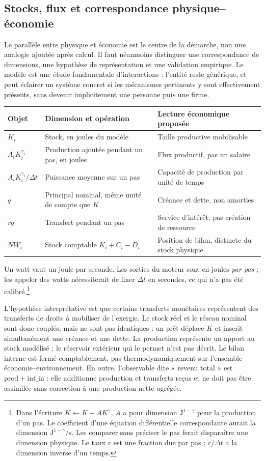 \subsection{Stocks, flux et correspondance physique--économie}
\label{sec:physique}
Le parallèle entre physique et économie est le centre de la démarche, non une
analogie ajoutée après calcul. Il faut néanmoins distinguer une correspondance
de dimensions, une hypothèse de représentation et une validation empirique.
Le modèle est une étude fondamentale d'interactions : l'entité reste générique,
et peut éclairer un système concret si les mécanismes pertinents y sont
effectivement présents, sans devenir implicitement une personne puis une firme.

\begin{center}
\begin{tabularx}{\linewidth}{@{}lXX@{}}
\toprule
Objet & Dimension et opération & Lecture économique proposée \\
\midrule
$K_i$ & Stock, en joules du modèle & Taille productive mobilisable \\
$A_iK_i^{\gamma_i}$ & Production ajoutée pendant un pas, en joules & Flux productif, pas un salaire \\
$A_iK_i^{\gamma_i}/\Delta t$ & Puissance moyenne sur un pas & Capacité de production par unité de temps \\
$q$ & Principal nominal, même unité de compte que $K$ & Créance et dette, non amorties \\
$rq$ & Transfert pendant un pas & Service d'intérêt, pas création de ressource \\
$NW_i$ & Stock comptable $K_i+C_i-D_i$ & Position de bilan, distincte du stock physique \\
\bottomrule
\end{tabularx}
\end{center}
Un watt vaut un joule par seconde. Les sorties du moteur sont en joules
\emph{par pas} ; les appeler des watts nécessiterait de fixer $\Delta t$ en
secondes, ce qui n'a pas été calibré.\footnote{Dans l'écriture
$K\leftarrow K+A K^\gamma$, $A$ a pour dimension
$\mathrm{J}^{1-\gamma}$ pour la production d'un pas. Le coefficient d'une
équation différentielle correspondante aurait la dimension
$\mathrm{J}^{1-\gamma}/\mathrm{s}$. Les comparer sans préciser le pas ferait
disparaître une dimension physique. Le taux $r$ est une fraction due par pas ;
$r/\Delta t$ a la dimension inverse d'un temps.}

L'hypothèse interprétative est que certains transferts monétaires représentent
des transferts de droits à mobiliser de l'exergie. Le stock réel et le réseau
nominal sont donc couplés, mais ne sont pas identiques : un prêt déplace $K$ et
inscrit simultanément une créance et une dette. La production représente un
apport au stock modélisé ; le réservoir extérieur qui le permet n'est pas
décrit. Le bilan interne est fermé comptablement, pas thermodynamiquement sur
l'ensemble économie--environnement. En outre, l'observable dite « revenu total »
est $\mathrm{prod}+\mathrm{int\_in}$ : elle additionne production et transferts
reçus et ne doit pas être assimilée sans correction à une production nette
agrégée.

